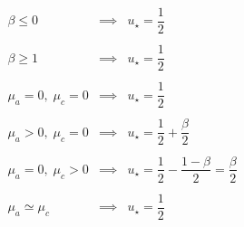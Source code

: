 \documentclass[aps,12pt]{revtex4}
\begin{document}
\begin{equation}
\begin{array}{lcl}
\beta \leq 0           & \implies & u_\star = \dfrac{1}{2}\\
\\
\beta \geq 1           & \implies & u_\star = \dfrac{1}{2}\\
\\
\mu_a = 0, \;\mu_c = 0 & \implies & u_\star = \dfrac{1}{2}\\
\\
\mu_a > 0, \;\mu_c = 0 & \implies & u_\star = \dfrac{1}{2} + \dfrac{\beta}{2} \\
\\
\mu_a = 0, \;\mu_c > 0 & \implies & u_\star = \dfrac{1}{2} - \dfrac{1-\beta}{2} = \dfrac{\beta}{2} \\
\\
\mu_a \simeq \mu_c & \implies & u_\star = \dfrac{1}{2} \\
\end{array}
\end{equation}
\end{document}
